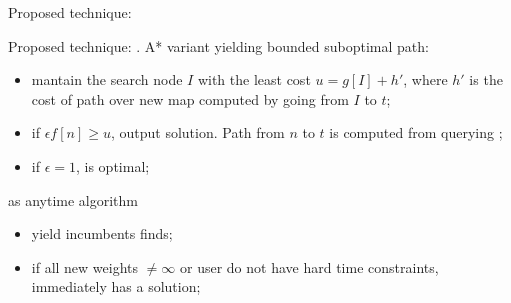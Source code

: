 \begin{frame}{Proposed technique: \CPDSearch{}}
{\begin{minipage}{0.35\textwidth}
\begin{center}
            \end{center}
        \end{minipage}
    }

\end{frame}


\begin{frame}{Proposed technique: \CPDSearch{}}
    \textbf{\CPDSearch{}}. A* variant yielding bounded suboptimal path:
    \begin{itemize}
        \item mantain the search node $I$ with the least cost $u = g[I] + h'$, where $h'$ is the cost of path over new map computed by \CPD{} going from $I$ to $t$;
        \item if $\epsilon f[n] \geq u$, output solution. Path from $n$ to $t$ is computed from querying \CPD{};
        \item if $\epsilon = 1$, \CPDSearch{} is optimal;
    \end{itemize}
    
\end{frame}

\begin{frame}{\CPDSearch{} as anytime algorithm}
    \begin{itemize}
        \item yield incumbents \CPDSearch{} finds;
        \item if all new weights $\not = \infty$ or user do not have hard time constraints, \CPDSearch{} immediately has a solution;
    \end{itemize}
\end{frame}